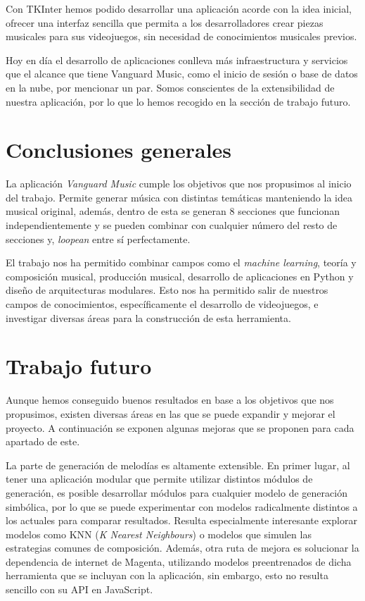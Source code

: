 Con TKInter hemos podido desarrollar una aplicación acorde con la idea inicial, ofrecer una interfaz sencilla que permita a los desarrolladores crear piezas musicales para sus videojuegos, sin necesidad de conocimientos musicales previos.

Hoy en día el desarrollo de aplicaciones conlleva más infraestructura y servicios que el alcance que tiene Vanguard Music, como el inicio de sesión o base de datos en la nube, por mencionar un par. Somos conscientes de la extensibilidad de nuestra aplicación, por lo que lo hemos recogido en la sección de trabajo futuro.

\section{Conclusiones generales}
La aplicación \textit{Vanguard Music} cumple los objetivos que nos propusimos al inicio del trabajo. Permite generar música con distintas temáticas manteniendo la idea musical original, además, dentro de esta se generan 8 secciones que funcionan independientemente y se pueden combinar con cualquier número del resto de secciones y, \textit{loopean} entre sí perfectamente.

El trabajo nos ha permitido combinar campos como el \textit{machine learning}, teoría y composición musical, producción musical, desarrollo de aplicaciones en Python y diseño de arquitecturas modulares. Esto nos ha permitido salir de nuestros campos de conocimientos, específicamente el desarrollo de videojuegos, e investigar diversas áreas para la construcción de esta herramienta.

\section{Trabajo futuro}

Aunque hemos conseguido buenos resultados en base a los objetivos que nos propusimos, existen diversas áreas en las que se puede expandir y mejorar el proyecto. A continuación se exponen algunas mejoras que se proponen para cada apartado de este.

La parte de generación de melodías es altamente extensible. En primer lugar, al tener una aplicación modular que permite utilizar distintos módulos de generación, es posible desarrollar módulos para cualquier modelo de generación simbólica, por lo que se puede experimentar con modelos radicalmente distintos a los actuales para comparar resultados. Resulta especialmente interesante explorar modelos como KNN (\textit{K Nearest Neighbours}) o modelos que simulen las estrategias comunes de composición. Además, otra ruta de mejora es solucionar la dependencia de internet de Magenta, utilizando modelos preentrenados de dicha herramienta que se incluyan con la aplicación, sin embargo, esto no resulta sencillo con su API en JavaScript.

